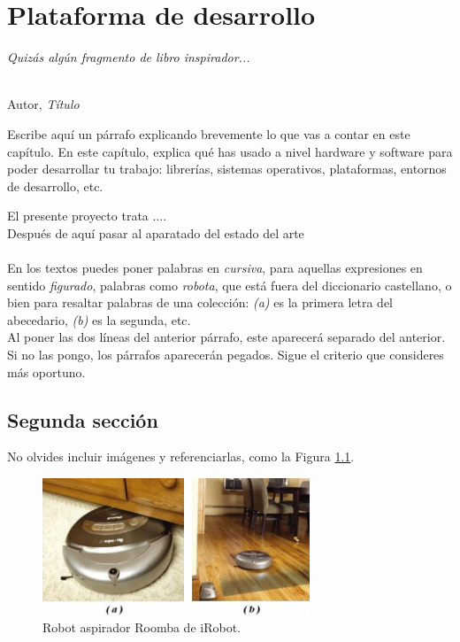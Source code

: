 \chapter{Plataforma de desarrollo}
\label{cap:capitulo3}

\begin{flushright}
\begin{minipage}[]{10cm}
\emph{Quizás algún fragmento de libro inspirador...}\\
\end{minipage}\\

Autor, \textit{Título}\\
\end{flushright}

\vspace{1cm}

Escribe aquí un párrafo explicando brevemente lo que vas a contar en este capítulo. En este capítulo, explica qué has usado a nivel hardware y software para poder desarrollar tu trabajo: librerías, sistemas operativos, plataformas, entornos de desarrollo, etc.




El presente proyecto trata ....\\


Después de aquí pasar al aparatado del estado del arte \\\\

En los textos puedes poner palabras en \textit{cursiva}, para aquellas expresiones en sentido \textit{figurado}, palabras como \textit{robota}, que está fuera del diccionario castellano, o bien para resaltar palabras de una colección: \textit{(a)} es la primera letra del abecedario, \textit{(b)} es la segunda, etc.\\

Al poner las dos líneas del anterior párrafo, este aparecerá separado del anterior. Si no las pongo, los párrafos aparecerán pegados. Sigue el criterio que consideres más oportuno.

\section{Segunda sección}
\label{sec:segundaseccion}

No olvides incluir imágenes y referenciarlas, como la Figura \ref{fig:roomba}.

\begin{figure} [h!]
	\begin{center}
		\includegraphics[width=8cm]{figs/roomba}
	\end{center}
	\caption{Robot aspirador Roomba de iRobot.}
	\label{fig:roomba}
\end{figure}\

